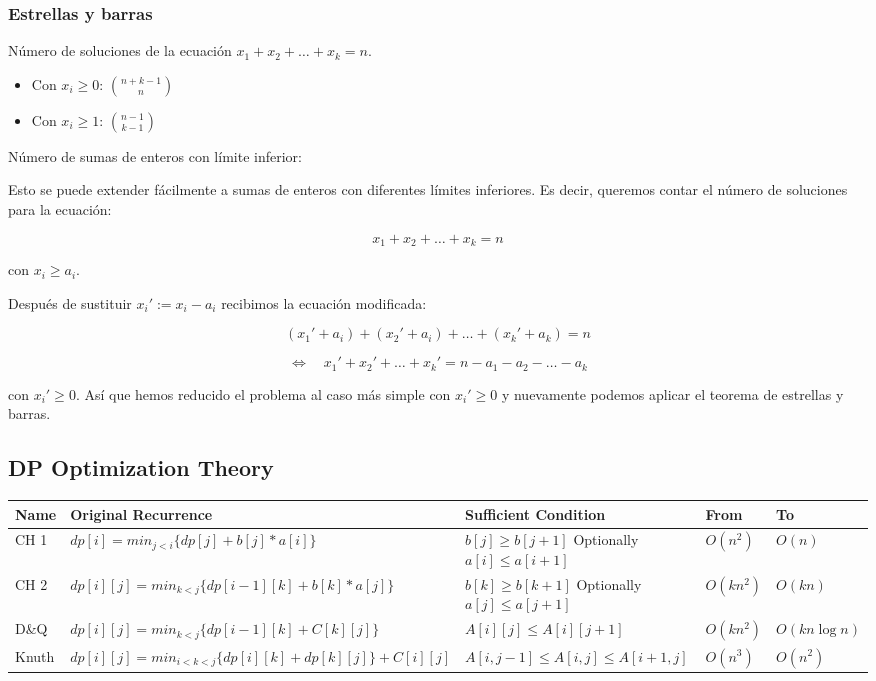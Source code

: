 \subsubsection{Estrellas y barras}

Número de soluciones de la ecuación \(x_1 + x_2 + \dots + x_k = n\).

\begin{itemize}
    \item Con \(x_i \ge 0\): \(\binom{n+k-1}{n}\)
    \item Con \(x_i \ge 1\): \(\binom{n-1}{k-1}\)
\end{itemize}

Número de sumas de enteros con límite inferior:

Esto se puede extender fácilmente a sumas de enteros con diferentes límites inferiores. Es decir, queremos contar el número de soluciones para la ecuación:

\[
x_1 + x_2 + \dots + x_k = n
\]

con \(x_i \ge a_i\).

Después de sustituir \(x_i' := x_i - a_i\) recibimos la ecuación modificada:

\[
(x_1' + a_i) + (x_2' + a_i) + \dots + (x_k' + a_k) = n
\]

\[
\Leftrightarrow \quad x_1' + x_2' + \dots + x_k' = n - a_1 - a_2 - \dots - a_k
\]

con \(x_i' \ge 0\). Así que hemos reducido el problema al caso más simple con \(x_i' \ge 0\) y nuevamente podemos aplicar el teorema de estrellas y barras.

\subsection{DP Optimization Theory}
\begin{tabular}{|p{0.8cm}| p{4.5cm}| p{3.3cm}|p{0.9cm}| p{1.3cm}|}
	\hline
	Name & Original Recurrence & Sufficient Condition & From  & To  \\ 
	\hline
	CH 1 & $dp[i] = min_{j<i}\{dp[j]+b[j]*a[i ]\}$ & $b[j] \geq b[j+1]$ Optionally $a[i] \leq a[i+1]$ & $O(n^2)$ & $O(n)$ \\ 
	\hline
	CH 2 & $dp[i][j] = min_{k<j}\{dp[i-1][k] + b[k] * a[j]\}$ & $b[k] \geq b[k+1]$ Optionally $a[j] \leq a[j+1]$ & $O(kn^2)$ & $O(kn)$ \\ 
	\hline
	D\&Q & $dp[i][j] = min_{k<j}\{dp[i-1][k] + C[k][j]\}$ & $A[i][j] \leq A[i][j+1]$ & $O(kn^2)$ & $O(kn\log n)$ \\ 
	\hline
	Knuth & $dp[i][j] = min_{i<k<j} \{dp[i][k] + dp[k][j] \} + C[i][j] $ & $A[i, j -1] \leq A[i, j] \leq A[i+1, j]$ & $O(n^3)$ & $O(n^2)$ \\ 
	\hline
\end{tabular} 

